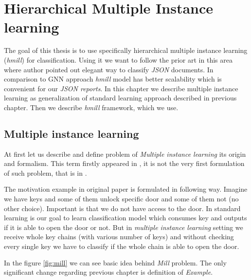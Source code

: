 \chapter{Hierarchical Multiple Instance learning} \label{chap:hmill}
The goal of this thesis is to use specifically hierarchical multiple instance learning (\emph{hmill}) for classification. Using it we want to follow the prior art in this area \cite{Mandlik2020} where author pointed out elegant way to classify \emph{JSON} documents. In comparison to GNN approach \emph{hmill} model has better scalability \cite{Mandlik2020} which is convenient for our \emph{JSON reports}. In this chapter we describe multiple instance learning as generalization of standard learning approach described in previous chapter. Then we describe \emph{hmill} framework, which we use.


\section{Multiple instance learning}
At first let us describe and define problem of \emph{Multiple instance learning} its origin and formalism. This term firstly appeared in \citet{Dietterich1997}, it is not the very first formulation of such problem, that is in \cite{Keeler1991}.

The motivation example in original paper \cite{Dietterich1997} is formulated in following way. Imagine we have keys and some of them unlock specific door and some of them not (no other choice). Important is that we do not have access to the door. In standard learning is our goal to learn classification model which consumes key and outputs if it is able to open the door or not. But in \emph{multiple instance learning} setting we receive whole key chains (with various number of keys) and without checking every single key we have to classify if the whole chain is able to open the door.

In the figure \ref{fig:mill} we can see basic idea behind \emph{Mill} problem. The only significant change regarding previous chapter is definition of \emph{Example}. 
